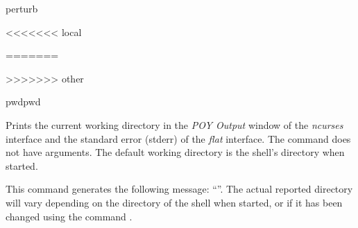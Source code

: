 \begin{command}{perturb}{}
\begin{poyexamples}
    \end{poyexamples}
               
<<<<<<< local
	\begin{poyalso}
	\end{poyalso}
	
=======
    \begin{poyalso}
    \end{poyalso}
    
>>>>>>> other
\end{command}



   
\begin{command}{pwd}{pwd}

    \syntax{\obligatory{()}}
    
    \begin{poydescription}
         Prints the current working directory in the \emph{POY Output} window of
         the \emph{ncurses} interface and the standard error (stderr) of the \emph{flat} interface.
         The command  does not have arguments. The default
         working directory is the shell's directory when \poy started.
    \end{poydescription}
    
    \begin{poyexamples}
            {This command generates the following message: ``''. The actual reported
            directory will vary depending on the directory of the shell when
            \poy started, or if it has been changed using the command
            .}
    \end{poyexamples}

    \begin{poyalso}
    \end{poyalso}

\end{command}



   
